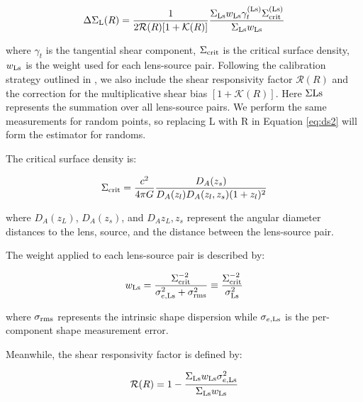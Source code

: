 \documentclass[fleqn,usenatbib,useAMS,english]{mnras}
\begin{document}
    \begin{equation}
        {\Delta\Sigma}_{\rm L}(R) = \frac{1}{2 \mathcal{R}(R) [1+\mathcal{K}(R)]}
            \frac{\Sigma_{\rm Ls} w_{\rm Ls} \gamma_{t}^{(\rm Ls)}
            \Sigma_{\rm crit}^{(\rm Ls)}}{\Sigma_{\rm Ls} w_{\rm Ls}}
        \label{eq:ds2}
    \end{equation}

    \noindent where $\gamma_{t}$ is the tangential shear component, $\Sigma_{\rm crit}$ is the
    critical surface density, $w_{\rm Ls}$ is the weight used for each lens-source pair.
    Following the calibration strategy outlined in \citet{HSC-WLCALIB}, we also include
    the shear responsivity factor $\mathcal{R}(R)$ and the correction for the multiplicative
    shear bias $[1+\mathcal{K}(R)]$.
    Here $\Sigma{\rm Ls}$ represents the summation over all lens-source pairs.
    We perform the same measurements for random points, so replacing L with R in
    Equation \ref{eq:ds2} will form the estimator for randoms.

    The critical surface density is:

    \begin{equation}
        \Sigma_{\rm crit}=\frac{c^2}{4\pi G} \frac{D_A(z_s)}{D_A(z_l) D_A(z_l, z_s) (1+z_l)^2}
        \label{eq:sigcrit}
    \end{equation}

    \noindent where $D_A(z_L)$, $D_A(z_s)$, and $D_A{z_L, z_s}$ represent the angular diameter
    distances to the lens, source, and the distance between the lens-source pair.

    The weight applied to each lens-source pair is described by:

    \begin{equation}
        w_{\rm Ls} = \frac{\Sigma_{\rm crit}^{-2}}{\sigma^2_{e, {\rm Ls}} + \sigma^2_{\rm rms}}
            \equiv \frac{\Sigma_{\rm crit}^{-2}}{\sigma^2_{{\rm Ls}}}
        \label{eq:weight}
    \end{equation}

    \noindent where $\sigma_{\rm rms}$ represents the intrinsic shape dispersion while
    $\sigma_{e, \rm Ls}$ is the per-component shape measurement error.

    Meanwhile, the shear responsivity factor is defined by:

    \begin{equation}
        \mathcal{R}(R) = 1 - \frac{\Sigma_{\rm Ls} w_{\rm Ls} \sigma^2_{e, {\rm Ls}}}{\Sigma_{\rm Ls} w_{\rm Ls}}
        \label{eq:rfactor}
    \end{equation}
\end{document}
